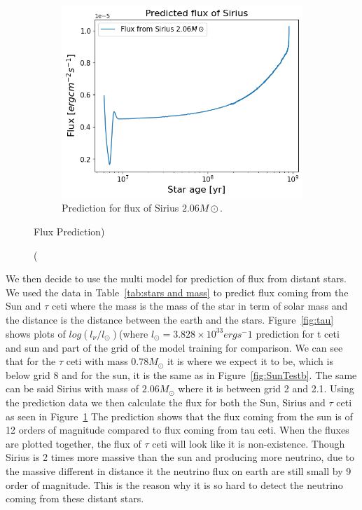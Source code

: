 \begin{figure}[H]
\begin{subfigure}{\textwidth}
		\includegraphics[width=\textwidth,height=0.5\textheight]{assets/fluxsirius.png}
		\caption{Prediction for flux of Sirius $2.06 M\odot$.}
	\end{subfigure}
	\caption(Flux Prediction)
	\label{fig:predicted flux}
\end{figure}

We then decide to use the multi model for prediction of flux from distant stars. We used the data in Table~\ref{tab:stars and mass} to predict flux coming from the Sun and $\tau$ ceti where the mass is the mass of the star in term of solar mass and the distance is the distance between the earth and the stars. Figure~\ref{fig:tau} shows plots of $log(l_\nu/l_\odot)$(where $l_\odot=3.828\times 10^33ergs^-1$ prediction for t ceti and sun and part of the grid of the model training for comparison. We can see that for the $\tau$ ceti with mass $0.78M_\odot$ it is where we expect it to be, which is below grid 8 and for the sun, it is the same as in Figure~\ref{fig:SunTestb}. The same can be said Sirius with mass of $2.06M_\odot$ where it is between grid 2 and 2.1. Using the prediction data we then calculate the flux for both the Sun, Sirius and $\tau$ ceti as seen in Figure~\ref{fig:predicted flux} The prediction shows that the flux coming from the sun is of 12 orders of magnitude compared to flux coming from tau ceti. When the fluxes are plotted together, the flux of $\tau$ ceti will look like it is non-existence. Though Sirius is 2 times more massive than the sun and producing more neutrino, due to the massive different in distance it the neutrino flux on earth are still small by 9 order of magnitude. This is the reason why it is so hard to detect the neutrino coming from these distant stars. 

